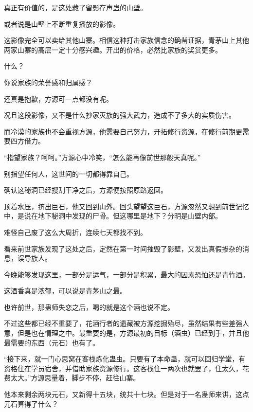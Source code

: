 \begin{this_body}
真正有价值的，是这处藏了留影存声蛊的山壁。

或者说是山壁上不断重复播放的影像。

这影像完全可以卖给其他山寨。相信这种打击家族信念的确凿证据，青茅山上其他两家山寨的高层一定十分感兴趣。开出的价格，必然比家族的奖赏更多。

什么？

你说家族的荣誉感和归属感？

还真是抱歉，方源可一点都没有呢。

况且这段影像，又不是什么抄家灭族的强大武力，造成不了多大的实质伤害。

而冷漠的家族也不会重视方源，他需要自己努力，开拓修行资源，在修行前期更需要四方借力。

“指望家族？呵呵。”方源心中冷笑，“怎么能再像前世那般天真呢。”

别指望任何人，这世间的一切都得靠自己。

确认这秘洞已经搜刮干净之后，方源便按照原路返回。

顶着水压，挤出巨石，他又回到山外。回头望望这巨石，方源忽然又想到前世记忆中，是说在地下秘洞中发现的尸骨。但这哪里是地下？分明是山壁内部。

难怪自己废了这么大周折，连续七天都找不到。

看来前世家族发现了这处之后，定然在第一时间摧毁了影壁，又发出真假掺杂的消息，误导族人。

今晚能够发现这里，一部分是运气，一部分是积累，最大的因素恐怕还是青竹酒。

这酒香真是浓郁，可以说是青茅山之最。

也许前世，那蛊师失恋之后，喝的就是这个酒也说不定。

不过这些都已经不重要了，花酒行者的遗藏被方源挖掘殆尽，虽然结果有些差强人意，但是也在情理之中。最重要的是，方源最初的目标（酒虫）已经到手，并且他最需要的东西（元石）也有了。

“接下来，就一门心思窝在客栈炼化蛊虫。只要有了本命蛊，就可以回归学堂，有资格住在学员宿舍，并借助家族资源修行。这客栈住一两次也就罢了，住太久，花费太大。”方源思量着，脚步不停，赶往山寨。

他本来剩余两块元石，又新得十五块，统共十七块。但是对于一名蛊师来讲，这点元石算得了什么？

\end{this_body}


